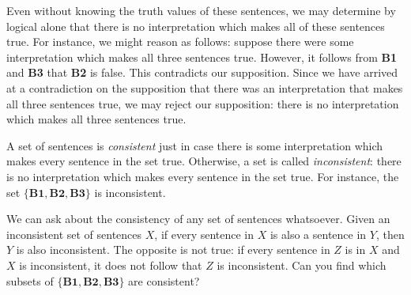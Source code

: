 Even without knowing the truth values of these sentences, we may determine by logical alone that there is no interpretation which makes all of these sentences true. 
For instance, we might reason as follows: suppose there were some interpretation which makes all three sentences true.
However, it follows from \textbf{B1} and \textbf{B3} that \textbf{B2} is false.
This contradicts our supposition.
Since we have arrived at a contradiction on the supposition that there was an interpretation that makes all three sentences true, we may reject our supposition: there is no interpretation which makes all three sentences true.

A set of sentences is \textit{consistent} just in case there is some interpretation which makes every sentence in the set true.
Otherwise, a set is called \textit{inconsistent}: there is no interpretation which makes every sentence in the set true.
For instance, the set $\{\textbf{B1}, \textbf{B2}, \textbf{B3}\}$ is inconsistent.

We can ask about the consistency of any set of sentences whatsoever.
Given an inconsistent set of sentences $X$, if every sentence in $X$ is also a sentence in $Y$, then $Y$ is also inconsistent. 
The opposite is not true: if every sentence in $Z$ is in $X$ and $X$ is inconsistent, it does not follow that $Z$ is inconsistent. 
Can you find which subsets of $\{\textbf{B1}, \textbf{B2}, \textbf{B3}\}$ are consistent?



%
%


